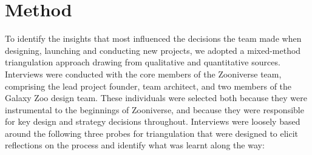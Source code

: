 \documentclass{sigchi}
\begin{document}

\section{Method}



To identify the insights that most influenced the decisions the team made when designing, launching and conducting new projects, we adopted a mixed-method triangulation approach \cite{olsen2004triangulation} drawing from qualitative and quantitative sources. Interviews were conducted with the core members of the Zooniverse team, comprising the lead project founder, team architect, and two members of the Galaxy Zoo design team.  These individuals were selected both because they were instrumental to the beginnings of Zooniverse, and because they were responsible for key design and strategy decisions throughout.  Interviews were loosely based around the following three probes for triangulation that were designed to elicit reflections on the process and identify what was learnt along the way:
\end{document}
